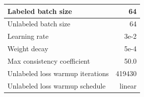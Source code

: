 \begin{tabular}{L{\WWW}  R{\RRR}}
\\ \hline
Labeled batch size & 64
\\ \hline
Unlabeled batch size & 64
\\ \hline
Learning rate & 3e-2
\\ \hline
Weight decay & 5e-4
\\ \hline
Max consistency coefficient & 50.0
\\ \hline
Unlabeled loss warmup iterations & 419430
\\ \hline
Unlabeled loss warmup schedule & linear
\end{tabular}